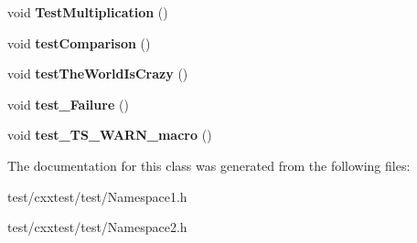 \begin{DoxyCompactItemize}
\item 
\hypertarget{classfoo_1_1bar_1_1Tests_a0b02e0f23457d6797bda982ab9c8bddf}{void {\bfseries Test\-Multiplication} ()}\label{classfoo_1_1bar_1_1Tests_a0b02e0f23457d6797bda982ab9c8bddf}

\item 
\hypertarget{classfoo_1_1bar_1_1Tests_a646b344360e1a10ea697cfe982ce3e1f}{void {\bfseries test\-Comparison} ()}\label{classfoo_1_1bar_1_1Tests_a646b344360e1a10ea697cfe982ce3e1f}

\item 
\hypertarget{classfoo_1_1bar_1_1Tests_a41fdb34c7d7ec5116eccf951e01dac66}{void {\bfseries test\-The\-World\-Is\-Crazy} ()}\label{classfoo_1_1bar_1_1Tests_a41fdb34c7d7ec5116eccf951e01dac66}

\item 
\hypertarget{classfoo_1_1bar_1_1Tests_a65c87f0f2273612455e59fd931cbb8bd}{void {\bfseries test\-\_\-\-Failure} ()}\label{classfoo_1_1bar_1_1Tests_a65c87f0f2273612455e59fd931cbb8bd}

\item 
\hypertarget{classfoo_1_1bar_1_1Tests_a0b2e0dc0667bc542f2a87b00f5722003}{void {\bfseries test\-\_\-\-T\-S\-\_\-\-W\-A\-R\-N\-\_\-macro} ()}\label{classfoo_1_1bar_1_1Tests_a0b2e0dc0667bc542f2a87b00f5722003}

\end{DoxyCompactItemize}


The documentation for this class was generated from the following files\-:\begin{DoxyCompactItemize}
\item 
test/cxxtest/test/Namespace1.\-h\item 
test/cxxtest/test/Namespace2.\-h\end{DoxyCompactItemize}
